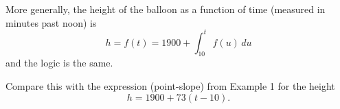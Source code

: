 \documentclass{ximera}
\begin{document}
More generally, the height of the balloon as a function of time (measured in minutes past noon) is
\[
  h = f(t) = 1900 + \int_{10}^{t} f(u)\, du
\]
and the logic is the same. 

Compare this with the expression (point-slope) from Example 1 for the height
\[
  h = 1900 + 73(t-10).
\]
\begin{freeResponse}
\end{freeResponse}
\end{document}
